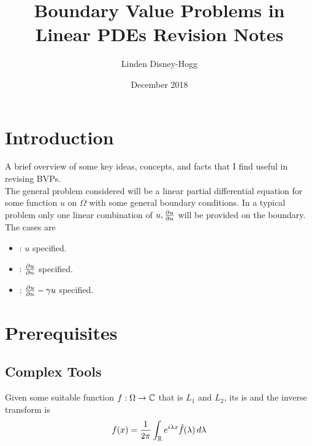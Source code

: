 \documentclass{article}
\title{Boundary Value Problems in Linear PDEs Revision Notes}
\author{Linden Disney-Hogg}
\date{December 2018}
\begin{document}
\maketitle
\tableofcontents

\section{Introduction}
A brief overview of some key ideas, concepts, and facts that I find useful in revising BVPs. \\
The general problem considered will be a linear partial differential equation for some function $u$ on $\Omega$ with some general boundary conditions. In a typical problem only one linear combination of $u, \pd[u]{n}$ will be provided on the boundary. The cases are 
\begin{itemize}
    \item {} : $u$ specified. 
    \item {} : $\pd[u]{n}$ specified.
    \item {} : $\pd[u]{n} - \gamma u$ specified. 
\end{itemize}

\section{Prerequisites}
\subsection{Complex Tools}
\begin{definition}
Given some suitable function $f:\Omega \to \mbb{C}$ that is $L_1$ and $L_2$, its  is 
and the inverse transform is 
\[
f(x) = \frac{1}{2\pi} \int_\mbb{R} e^{i\lambda x} \hat{f}(\lambda) \, d\lambda
\]
\end{definition}

\begin{lemma}
\end{lemma}
\end{document}

